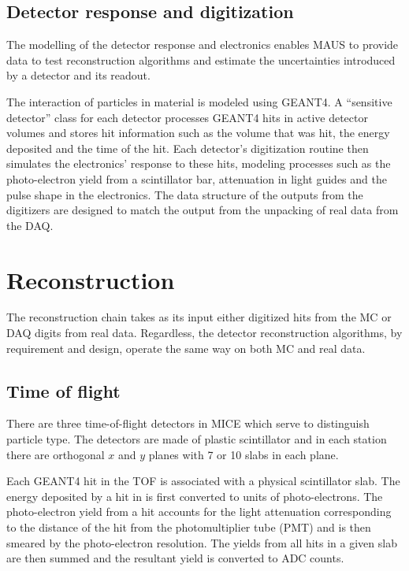 \documentclass{JINST}
\begin{document}
\subsection{Detector response and digitization}\label{sec:detresp}
The modelling of the detector response and electronics enables MAUS to provide  data to test reconstruction algorithms and estimate the uncertainties introduced by a detector and its readout.

The interaction of particles in material is modeled using GEANT4. A ``sensitive detector'' class for each detector processes GEANT4 hits in active detector volumes and stores  hit information such as the volume that was hit, the energy deposited and the time of the hit. Each detector's digitization routine then simulates the electronics' response to these hits, modeling processes such as the photo-electron yield from a scintillator bar, attenuation in light guides and the pulse shape in the electronics. The data structure of the outputs from the digitizers are designed to match the output from the unpacking of real data from the DAQ.


\section{Reconstruction}\label{sec:recon}
The reconstruction chain takes as its input either digitized hits from the MC or DAQ digits from real data. Regardless, the detector reconstruction algorithms, by requirement and design, operate the same way on both MC and real data. 
%

\subsection{Time of flight}

There are three time-of-flight detectors in MICE which serve to distinguish particle type. The detectors are made of plastic scintillator and in each station there are orthogonal $x$ and $y$ planes with 7 or 10 slabs in each plane. 

Each GEANT4 hit in the TOF is associated with a physical scintillator slab. The energy deposited by a hit in is first converted to units of photo-electrons. The photo-electron yield from a hit accounts for the light attenuation corresponding to the distance of the hit from the photomultiplier tube (PMT) and is then smeared by the photo-electron resolution. The yields from all hits in a given slab are then summed and the resultant yield is converted to ADC counts.
\end{document}
